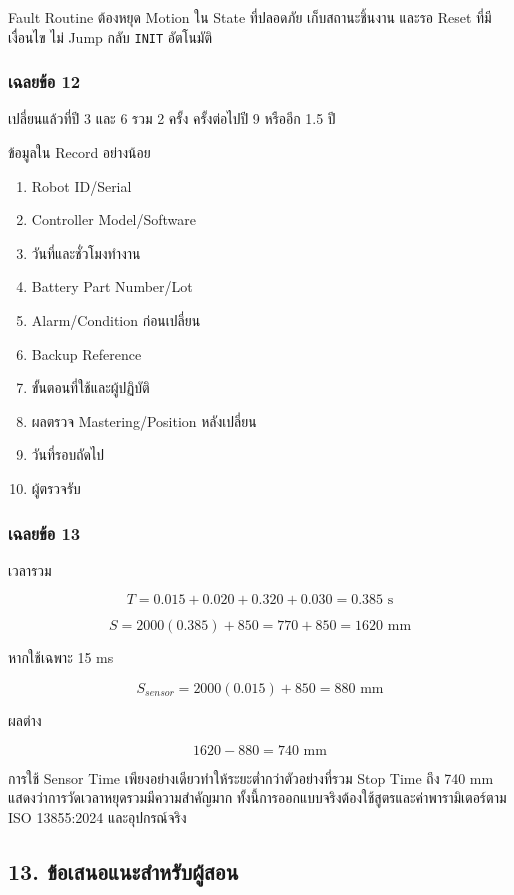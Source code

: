 Fault Routine ต้องหยุด Motion ใน State ที่ปลอดภัย เก็บสถานะชิ้นงาน และรอ Reset ที่มีเงื่อนไข ไม่ Jump กลับ \texttt{INIT} อัตโนมัติ

\subsubsection{เฉลยข้อ 12}

เปลี่ยนแล้วที่ปี 3 และ 6 รวม 2 ครั้ง ครั้งต่อไปปี 9 หรืออีก 1.5 ปี

ข้อมูลใน Record อย่างน้อย

\begin{enumerate}
    \item Robot ID/Serial
    \item Controller Model/Software
    \item วันที่และชั่วโมงทำงาน
    \item Battery Part Number/Lot
    \item Alarm/Condition ก่อนเปลี่ยน
    \item Backup Reference
    \item ขั้นตอนที่ใช้และผู้ปฏิบัติ
    \item ผลตรวจ Mastering/Position หลังเปลี่ยน
    \item วันที่รอบถัดไป
    \item ผู้ตรวจรับ
\end{enumerate}

\subsubsection{เฉลยข้อ 13}

เวลารวม

\[
T=0.015+0.020+0.320+0.030=0.385\text{ s}
\]

\[
S=2000(0.385)+850=770+850=1620\text{ mm}
\]

หากใช้เฉพาะ 15 ms

\[
S_{sensor}=2000(0.015)+850=880\text{ mm}
\]

ผลต่าง

\[
1620-880=740\text{ mm}
\]

การใช้ Sensor Time เพียงอย่างเดียวทำให้ระยะต่ำกว่าตัวอย่างที่รวม Stop Time ถึง 740 mm แสดงว่าการวัดเวลาหยุดรวมมีความสำคัญมาก ทั้งนี้การออกแบบจริงต้องใช้สูตรและค่าพารามิเตอร์ตาม ISO 13855:2024 และอุปกรณ์จริง



\subsection{13. ข้อเสนอแนะสำหรับผู้สอน}

